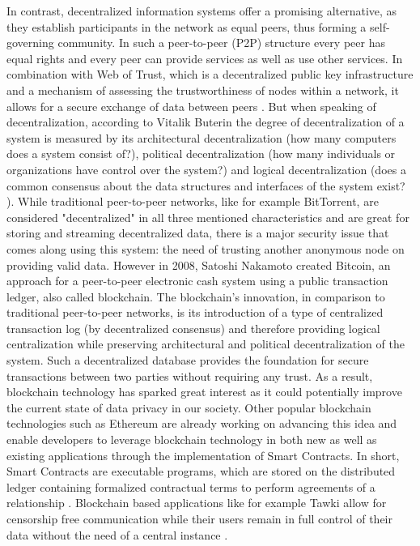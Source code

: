 In contrast, decentralized information systems offer a promising alternative, as they establish participants in the network as equal peers, thus forming a self-governing community.
In such a peer-to-peer (P2P) structure every peer has equal rights and every peer can provide services as well as use other services. In combination with Web of Trust, which is a decentralized public key infrastructure and a mechanism of assessing the trustworthiness of nodes within a network, it allows for a secure exchange of data between peers \cite{durandDecentralizedWebTrust2017}. But when speaking of decentralization, according to Vitalik Buterin \cite{buterinMeaningDecentralization2017} the degree of decentralization of a system is measured by its architectural decentralization (how many computers does a system consist of?), political decentralization (how many individuals or organizations have control over the system?) and logical decentralization (does a common consensus about the data structures and interfaces of the system exist? ). While traditional peer-to-peer networks, like for example BitTorrent, are considered "decentralized" in all three mentioned characteristics and are great for storing and streaming decentralized data, there is a major security issue that comes along using this system: the need of trusting another anonymous node on providing valid data. However in 2008, Satoshi Nakamoto \cite{nakamotoBitcoinPeertoPeerElectronic} created Bitcoin, an approach for a peer-to-peer electronic cash system using a public transaction ledger, also called blockchain. The blockchain's innovation, in comparison to traditional peer-to-peer networks, is its introduction of a type of centralized transaction log (by decentralized consensus) and therefore providing logical centralization while preserving architectural and political decentralization of the system. Such a decentralized database provides the foundation for secure transactions between two parties without requiring any trust. As a result, blockchain technology has sparked great interest as it could potentially improve the current state of data privacy in our society. Other popular blockchain technologies such as Ethereum \cite{woodETHEREUMSECUREDECENTRALISED} are already working on advancing this idea and enable developers to leverage blockchain technology in both new as well as existing applications through the implementation of Smart Contracts. In short, Smart Contracts are executable programs, which are stored on the distributed ledger containing
formalized contractual terms to perform agreements of a relationship \cite{NickSzaboSmart}. Blockchain based applications like for example Tawki allow for censorship free communication while their users remain in full control of their data without the need of a central instance \cite{westerkampTawkiSelfSovereignSocial2019}. 

